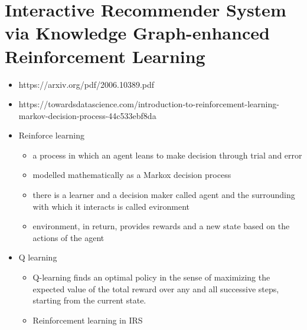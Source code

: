 \documentclass{report}
\begin{document}
\section{Interactive Recommender System via Knowledge Graph-enhanced Reinforcement Learning}
\begin{itemize}
    \item https://arxiv.org/pdf/2006.10389.pdf
    \item https://towardsdatascience.com/introduction-to-reinforcement-learning-markov-decision-process-44c533ebf8da
    \item Reinforce learning 
    \begin{itemize}
        \item a process in which an agent leans to make decision through trial and error
        \item modelled mathematically as a Markox decision process
        \item there is a learner and a decision maker called agent and the surrounding with which it interacts is called evironment
        \item environment, in return, provides rewards and a new state based on the actions of the agent
    \end{itemize}
    
    \item Q learning
    \begin{itemize}
        \item Q-learning finds an optimal policy in the sense of maximizing the expected value of the total reward over any and all successive steps, starting from the current state.
   
    \item Reinforcement learning in IRS 
    

\end{itemize}
\end{itemize}
\end{document}

